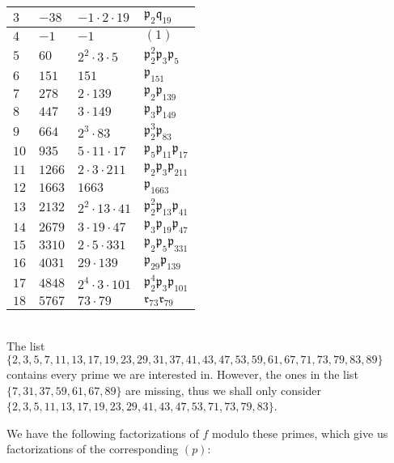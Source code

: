 \documentclass{article}
\newcommand{\pid}{\mathfrak{p}}
\newcommand{\qid}{\mathfrak{q}}
\begin{document}
\begin{tabular}{|l|l|l|l|}
  $3$ & $-38$ & $-1 \cdot 2 \cdot 19$ & $\pid_2\qid_{19}$ \\ \hline
  $4$ & $-1$ & $-1$ & $(1)$ \\ \hline
  $5$ & $60$ & $2^{2} \cdot 3 \cdot 5$ & $\pid_2^2\pid_3\pid_5$ \\ \hline
  $6$ & $151$ & $151$ & $\pid_{151}$ \\ \hline
  $7$ & $278$ & $2 \cdot 139$ & $\pid_2\pid_{139}$ \\ \hline
  $8$ & $447$ & $3 \cdot 149$ & $\pid_3\pid_{149}$ \\ \hline
  $9$ & $664$ & $2^{3} \cdot 83$ & $\pid_2^3\pid_{83}$ \\ \hline
  $10$ & $935$ & $5 \cdot 11 \cdot 17$ & $\pid_5\pid_{11}\pid_{17}$ \\ \hline
  $11$ & $1266$ & $2 \cdot 3 \cdot 211$ & $\pid_2\pid_3\pid_{211}$ \\ \hline
  $12$ & $1663$ & $1663$ & $\pid_{1663}$ \\ \hline
  $13$ & $2132$ & $2^{2} \cdot 13 \cdot 41$ & $\pid_2^2\pid_{13}\pid_{41}$ \\ \hline
  $14$ & $2679$ & $3 \cdot 19 \cdot 47$ & $\pid_3\pid_{19}\pid_{47}$ \\ \hline
  $15$ & $3310$ & $2 \cdot 5 \cdot 331$ & $\pid_2\pid_5\pid_{331}$ \\ \hline
  $16$ & $4031$ & $29 \cdot 139$ & $\pid_{29}\pid_{139}$ \\ \hline
  $17$ & $4848$ & $2^{4} \cdot 3 \cdot 101$ & $\pid_2^4\pid_3\pid_{101}$ \\ \hline
  $18$ & $5767$ & $73 \cdot 79$ & $\mathfrak{r}_{73}\mathfrak{r}_{79}$ \\ \hline
\end{tabular}

~\\
The list $\{2,3,5,7,11,13,17,19,23,29,31,37,41,43,47,53,59,61,67,71,73,79,83,89\}$ contains every prime we are interested in. However, the ones in the list $\{7,31,37,59,61,67,89\}$ are missing, thus we shall only consider $\{2,3,5,11,13,17,19,23,29,41,43,47,53,71,73,79,83\}$.

We have the following factorizations of $f$ modulo these primes, which give us factorizations of the corresponding $(p)$:
\end{document}
